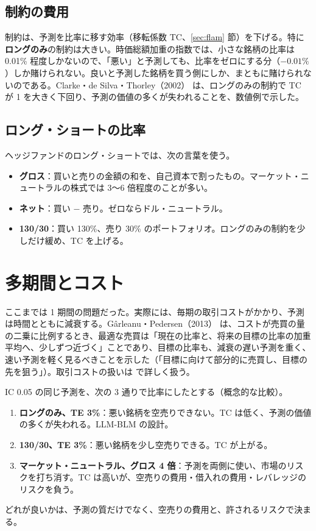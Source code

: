 \subsection{制約の費用}

制約は、予測を比率に移す効率（移転係数 TC、\ref{sec:flam} 節）を下げる。特に\textbf{ロングのみ}の制約は大きい。時価総額加重の指数では、小さな銘柄の比率は 0.01\% 程度しかないので、「悪い」と予測しても、比率をゼロにする分（$-0.01\%$）しか賭けられない。良いと予測した銘柄を買う側にしか、まともに賭けられないのである。Clarke・de Silva・Thorley（2002）\cite{cdt2002} は、ロングのみの制約で TC が 1 を大きく下回り、予測の価値の多くが失われることを、数値例で示した。

\subsection{ロング・ショートの比率}

ヘッジファンドのロング・ショートでは、次の言葉を使う。
\begin{itemize}
\item \textbf{グロス}：買いと売りの金額の和を、自己資本で割ったもの。マーケット・ニュートラルの株式では 3〜6 倍程度のことが多い。
\item \textbf{ネット}：買い − 売り。ゼロならドル・ニュートラル。
\item \textbf{130/30}：買い 130\%、売り 30\% のポートフォリオ。ロングのみの制約を少しだけ緩め、TC を上げる。
\end{itemize}

\section{多期間とコスト}

ここまでは 1 期間の問題だった。実際には、毎期の取引コストがかかり、予測は時間とともに減衰する。Gârleanu・Pedersen（2013）\cite{garleanupedersen2013} は、コストが売買の量の二乗に比例するとき、最適な売買は「現在の比率と、将来の目標の比率の加重平均へ、少しずつ近づく」ことであり、目標の比率も、減衰の遅い予測を重く、速い予測を軽く見るべきことを示した（「目標に向けて部分的に売買し、目標の先を狙う」）。取引コストの扱いは  で詳しく扱う。

\begin{exbox}
IC 0.05 の同じ予測を、次の 3 通りで比率にしたとする（概念的な比較）。
\begin{enumerate}
\item \textbf{ロングのみ、TE 3\%}：悪い銘柄を空売りできない。TC は低く、予測の価値の多くが失われる。LLM-BLM の設計。
\item \textbf{130/30、TE 3\%}：悪い銘柄を少し空売りできる。TC が上がる。
\item \textbf{マーケット・ニュートラル、グロス 4 倍}：予測を両側に使い、市場のリスクを打ち消す。TC は高いが、空売りの費用・借入れの費用・レバレッジのリスクを負う。
\end{enumerate}
どれが良いかは、予測の質だけでなく、空売りの費用と、許されるリスクで決まる。
\end{exbox}
